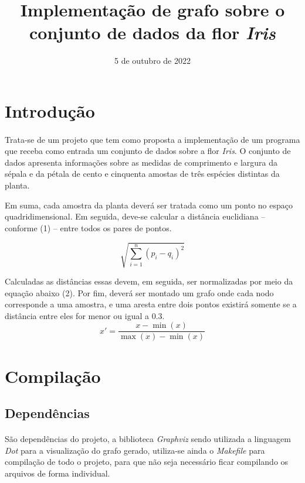 \documentclass{article}
\title{Implementação de grafo sobre o conjunto de dados da flor {\it Iris\/}}
\author{\sc{Elian Babireski \& Vinícios Bidin}}
\date{5 de outubro de 2022}
\begin{document}
    \maketitle
    
    \section{Introdução}
        \paragraph{} Trata-se de um projeto que tem como proposta a implementação de um programa que receba como entrada um conjunto de dados sobre a flor {\it Iris}. O conjunto de dados apresenta informações sobre as medidas de comprimento e largura da sépala e da pétala de cento e cinquenta amostas de três espécies distintas da planta.
		\par Em suma, cada amostra da planta deverá ser tratada como um ponto no espaço quadridimensional. Em seguida, deve-se calcular a distância euclidiana – conforme (1) – entre todos os pares de pontos.

        \begin{equation}
            \sqrt{\sum_{i = 1} ^ n {(p_i - q_i)} ^ 2}
        \end{equation}

        Calculadas as distâncias essas devem, em seguida, ser normalizadas por meio da equação abaixo (2). Por fim, deverá ser montado um grafo onde cada nodo corresponde a uma amostra, e uma aresta entre dois pontos existirá somente se a distância entre eles for menor ou igual a 0.3.
        \begin{equation}
            x' = \frac{x - \min(x)}{\max(x) - \min(x)}
        \end{equation}

		\section{Compilação}
			\subsection{Dependências}
				\paragraph{} São dependências do projeto, a biblioteca {\it Graphviz} sendo utilizada a linguagem {\it Dot} para a visualização do grafo gerado, utiliza-se ainda o {\it Makefile} para compilação de todo o projeto, para que não seja necessário ficar compilando os arquivos de forma individual.
			
\end{document}
